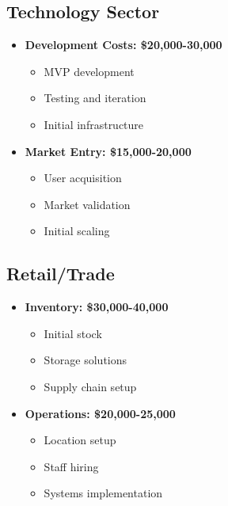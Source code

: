 \subsection{Technology Sector}\label{subsec:technology-sector}
\begin{tcolorbox}[colback=white,colframe=primary,title=\textbf{Tech Sector Financial Focus}]
\begin{itemize}
    \item \textbf{Development Costs: \$20,000-30,000}
    \begin{itemize}
        \item MVP development
        \item Testing and iteration
        \item Initial infrastructure
    \end{itemize}

    \item \textbf{Market Entry: \$15,000-20,000}
    \begin{itemize}
        \item User acquisition
        \item Market validation
        \item Initial scaling
    \end{itemize}
\end{itemize}
\end{tcolorbox}

\subsection{Retail/Trade}\label{subsec:retail-trade}
\begin{tcolorbox}[colback=white,colframe=primary,title=\textbf{Retail/Trade Financial Focus}]
\begin{itemize}
    \item \textbf{Inventory: \$30,000-40,000}
    \begin{itemize}
        \item Initial stock
        \item Storage solutions
        \item Supply chain setup
    \end{itemize}

    \item \textbf{Operations: \$20,000-25,000}
    \begin{itemize}
        \item Location setup
        \item Staff hiring
        \item Systems implementation
    \end{itemize}
\end{itemize}
\end{tcolorbox}

